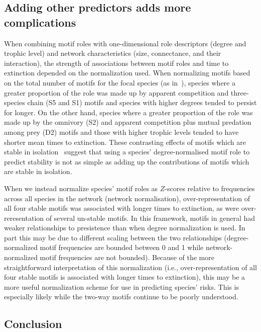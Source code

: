 \documentclass[12pt]{article}
\begin{document}
	\subsection*{Adding other predictors adds more complications}

		When combining motif roles with one-dimensional role descriptors (degree and trophic level) and network characteristics (size, connectance, and their interaction), the strength of associations between motif roles and time to extinction depended on the normalization used.
		When normalizing motifs based on the total number of motifs for the focal species (as in~\citet{Stouffer2012,Cirtwill2015}), species where a greater proportion of the role was made up by apparent competition and three-species chain (S5 and S1) motifs and species with higher degrees tended to persist for longer.
		On the other hand, species where a greater proportion of the role was made up by the omnivory (S2) and apparent competition plus mutual predation among prey (D2) motifs and those with higher trophic levels tended to have shorter mean times to extinction.
		These contrasting effects of motifs which are stable in isolation~\citep{Borelli2015a} suggest that using a species' degree-normalised motif role to predict stability is not as simple as adding up the contributions of motifs which are stable in isolation.


		When we instead normalize species' motif roles as $Z$-scores relative to frequencies across all species in the network (network normalisation), over-representation of all four stable motifs was associated with longer times to extinction, as were over-reresentation of several un-stable motifs.
		In this framework, motifs in general had weaker relationships to presistence than when degree normalization is used. 
		In part this may be due to different scaling between the two relationships (degree-normalized motif frequencies are bounded between 0 and 1 while network-normalized motif frequencies are not bounded).
		Because of the more straightforward interpretation of this normalization (i.e., over-representation of all four stable motifs is associated with longer times to extinction), this may be a more useful normalization scheme for use in predicting species' risks.
		This is especially likely while the two-way motifs continue to be poorly understood.

	
	\subsection*{Conclusion}	
\end{document}
